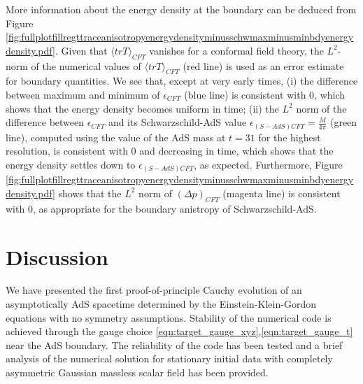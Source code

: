 \documentclass[a4paper,11pt]{article}
\begin{document}
More information about the energy density at the boundary can be deduced from Figure \ref{fig:fullplotfillregttraceanisotropyenergydensityminusschwmaxminusminbdyenergydensity.pdf}. Given that $\langle trT\rangle_{CFT}$ vanishes for a conformal field theory, the $L^2$-norm of the numerical values of $\langle trT\rangle_{CFT}$ (red line) is used as an error estimate for boundary quantities. We see that, except at very early times, (i) the difference between maximum and minimum of $\epsilon_{CFT}$ (blue line) is consistent with 0, which shows that the energy density becomes uniform in time; (ii) the $L^2$ norm of the difference between $\epsilon_{CFT}$ and its Schwarzschild-AdS value $\epsilon_{(S-AdS) CFT}=\frac{M}{4\pi}$ (green line), computed using the value of the AdS mass at $t=31$ for the highest resolution, is consistent with 0 and decreasing in time, which shows that the energy density settles down to $\epsilon_{(S-AdS) CFT}$, as expected. Furthermore, Figure \ref{fig:fullplotfillregttraceanisotropyenergydensityminusschwmaxminusminbdyenergydensity.pdf} shows that the $L^2$ norm of $(\Delta p)_{CFT}$ (magenta line) is consistent with 0, as appropriate for the boundary anistropy of Schwarzschild-AdS.





\section{Discussion}\label{sec:Discussion}

We have presented the first proof-of-principle Cauchy evolution of an asymptotically AdS spacetime determined by the Einstein-Klein-Gordon equations with no symmetry assumptions. Stability of the numerical code is achieved through the gauge choice \eqref{eqn:target_gauge_xyz},\eqref{eqn:target_gauge_t} near the AdS boundary. The reliability of the code has been tested and a brief analysis of the numerical solution for stationary initial data with completely asymmetric Gaussian massless scalar field has been provided.
\end{document}

